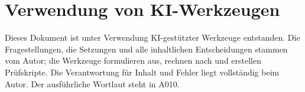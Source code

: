 \section{Verwendung von KI-Werkzeugen}

Dieses Dokument ist unter Verwendung KI-gestützter Werkzeuge entstanden. Die
Fragestellungen, die Setzungen und alle inhaltlichen Entscheidungen stammen vom
Autor; die Werkzeuge formulieren aus, rechnen nach und erstellen Prüfskripte.
Die Verantwortung für Inhalt und Fehler liegt vollständig beim Autor. Der
ausführliche Wortlaut steht in A010.
